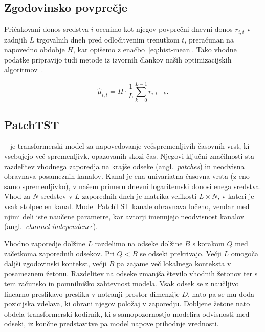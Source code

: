 \documentclass[9pt]{style/friteza}
\begin{document}
\subsection{Zgodovinsko povprečje}\label{sec:hist}

Pričakovani donos sredstva $i$ ocenimo kot njegov povprečni dnevni donos $r_{i,t}$ v zadnjih $L$ trgovalnih dneh pred odločitvenim trenutkom $t$, preračunan na napovedno obdobje $H$, kar opišemo z enačbo~\eqref{eq:hist-mean}. Tako vhodne podatke pripravijo tudi metode iz izvornih člankov naših optimizacijskih algoritmov~\cite{chang2000,cura2009}.

\begin{equation}
\label{eq:hist-mean}
\hat{\mu}_{i,t}
=
H\cdot\frac{1}{L}\sum_{k=0}^{L-1} r_{i,t-k}.
\end{equation}


\subsection{PatchTST}\label{sec:patchtst}~\cite{nie2023patchtst} je transformerski model za napovedovanje večspremenljivih časovnih vrst, ki vsebujejo več spremenljivk, opazovanih skozi čas. Njegovi ključni značilnosti sta razdelitev vhodnega zaporedja na krajše odseke (angl.\ \emph{patches}) in neodvisna obravnava posameznih kanalov. Kanal je ena univariatna časovna vrsta (z eno samo spremenljivko), v našem primeru dnevni logaritemski donosi enega sredstva. Vhod za $N$ sredstev v $L$ zaporednih dneh je matrika velikosti $L\times N$, v kateri je vsak stolpec en kanal. Model PatchTST kanale obravnava ločeno, vendar med njimi deli iste naučene parametre, kar avtorji imenujejo neodvisnost kanalov (angl.\ \emph{channel independence}).

Vhodno zaporedje dolžine $L$ razdelimo na odseke dolžine $B$ s korakom $Q$ med začetkoma zaporednih odsekov. Pri $Q<B$ se odseki prekrivajo. Večji $L$ omogoča daljši zgodovinski kontekst, večji $B$ pa zajame več lokalnega konteksta v posameznem žetonu. Razdelitev na odseke zmanjša število vhodnih žetonov ter s tem računsko in pomnilniško zahtevnost modela. Vsak odsek se z naučljivo linearno preslikavo preslika v notranji prostor dimenzije $D$, nato pa se mu doda pozicijska vdelava, ki ohrani njegov položaj v zaporedju. Dobljene žetone nato obdela transformerski kodirnik, ki s samopozornostjo modelira odvisnosti med odseki, iz končne predstavitve pa model napove prihodnje vrednosti.
\end{document}
